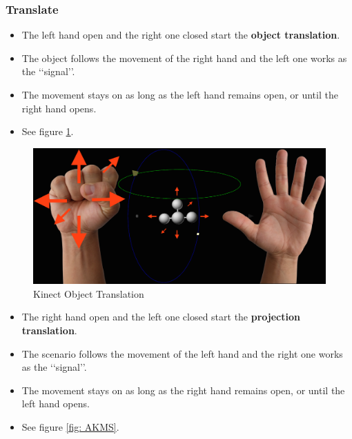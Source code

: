 \documentclass[12pt]{extarticle}
\begin{document}
\begin{appendices}
\subsubsection {Translate} \label{app:subsubsec Move}
\begin{itemize}
\item The left hand open and the right one closed start the \textbf{object translation}.\\
\item The object follows the movement of the right hand and the left one works as the \lq\lq{}signal\rq\rq{}. \\
\item The movement stays on as long as the left hand remains open, or until the right hand opens.\\
\item See figure \ref{fig: AKMO}.
\end{itemize}
\begin{center}
\begin{figure}[!h]
\includegraphics[scale=0.4]{Images/KinectMoveObject.png}
\caption{Kinect Object Translation}
\label{fig: AKMO}
\end{figure}
\end{center}
\begin{itemize}
\item The right hand open and the left one closed start the \textbf{projection translation}.\\
\item The scenario follows the movement of the left hand and the right one works as the \lq\lq{}signal\rq\rq{}.\\
\item The movement stays on as long as the right hand remains open, or until the left hand opens.\\
\item See figure \ref{fig: AKMS}.
\end{itemize}

\end{appendices}
\end{document}
